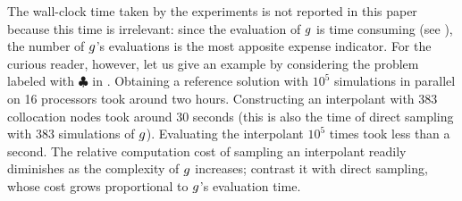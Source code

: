 \begin{remark}
The wall-clock time taken by the experiments is not reported in this paper
because this time is irrelevant: since the evaluation of $g$ is time consuming
(see ), the number of $g$'s evaluations is the most apposite
expense indicator. For the curious reader, however, let us give an example by
considering the problem labeled with $\clubsuit$ in . Obtaining a
reference solution with $10^5$ simulations in parallel on 16 processors took
around two hours. Constructing an interpolant with 383 collocation nodes took
around 30 seconds (this is also the time of direct sampling with 383 simulations
of $g$). Evaluating the interpolant $10^5$ times took less than a second. The
relative computation cost of sampling an interpolant readily diminishes as the
complexity of $g$ increases; contrast it with direct sampling, whose cost grows
proportional to $g$'s evaluation time.
\end{remark}
